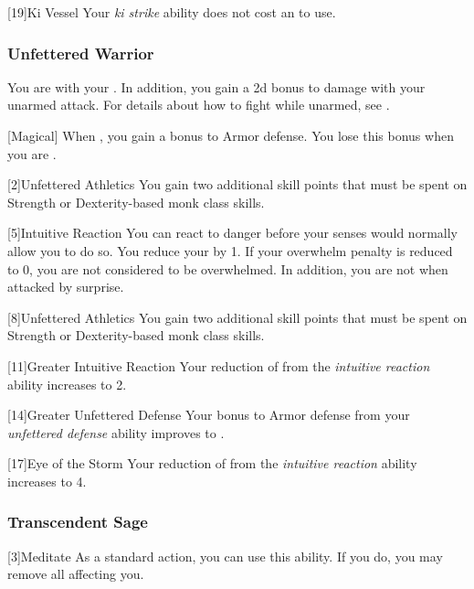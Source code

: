             [19]{Ki Vessel} Your \textit{ki strike} ability does not cost an  to use.

        \subsubsection{Unfettered Warrior}
            You are  with your .
            In addition, you gain a \plus2d bonus to damage with your unarmed attack.
            For details about how to fight while unarmed, see .

            [Magical]
            When \monkunencumbered, you gain a  bonus to Armor defense.
            You lose this bonus when you are \helpless.

            [2]{Unfettered Athletics} You gain two additional skill points that must be spent on Strength or Dexterity-based monk class skills.

            [5]{Intuitive Reaction} You can react to danger before your senses would normally allow you to do so.
            You reduce your  by 1.
            If your overwhelm penalty is reduced to 0, you are not considered to be overwhelmed.
            In addition, you are not \unaware when attacked by surprise.

            [8]{Unfettered Athletics} You gain two additional skill points that must be spent on Strength or Dexterity-based monk class skills.

            [11]{Greater Intuitive Reaction}
            Your reduction of  from the \textit{intuitive reaction} ability increases to 2.

            [14]{Greater Unfettered Defense}
            Your bonus to Armor defense from your \textit{unfettered defense} ability improves to .

            [17]{Eye of the Storm}
            Your reduction of  from the \textit{intuitive reaction} ability increases to 4.

        \subsubsection{Transcendent Sage}

            [3]{Meditate} As a standard action, you can use this ability.
            If you do, you may remove all  affecting you.

